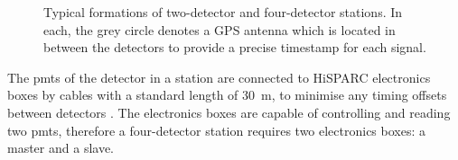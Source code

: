 \begin{figure}[ht!]
	\centering
	\qquad
	\qquad
	\caption{Typical formations of two-detector and four-detector stations. In each, the grey circle denotes a GPS antenna which is located in between the detectors to provide a precise timestamp for each signal.}
	\label{fig:HS_station_layouts}
\end{figure}


The \glspl{pmt} of the detector in a station are connected to HiSPARC electronics boxes by cables with a standard length of 30~m, to minimise any timing offsets between detectors \citep{fokkema_hisparc_2012, van_dam_hisparc_2020}. The electronics boxes are capable of controlling and reading two \glspl{pmt}, therefore a four-detector station requires two electronics boxes: a master and a slave.

